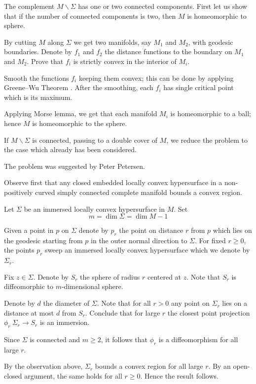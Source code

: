 The complement $M\backslash\Sigma$ has one or two connected components.
First let us show that if the number of connected components is two, 
then $M$ is homeomorphic to sphere.

By cutting $M$ along $\Sigma$ 
we get two manifolds, say $M_1$ and $M_2$,
with geodesic boundaries. 
Denote by $f_1$ and $f_2$ the distance functions to the boundary on $M_1$ and $M_2$.
Prove that  
$f_i$ is strictly convex in the interior of $M_i$.

Smooth the functions $f_i$ keeping them convex; 
this can be done by applying Greene--Wu Theorem \cite[see Theorem~2 in][]{greene-wu}.
After the smoothing, each $f_i$ has single critical point which is its maximum.

Applying Morse lemma, we get that each manifold $M_i$ is homeomorphic to a ball; 
hence $M$ 
is homeomorphic to the sphere.

If $M\backslash\Sigma$ is connected,
passing to a double cover of $M$,
we reduce the problem to the case which already has been considered.\qeds

The problem was suggested by Peter Petersen.



Observe first that any closed embedded locally convex hypersurface in a non-positively curved simply connected complete manifold bounds a convex region.


Let $\Sigma$ be an immersed locally convex hypersurface in $M$.
Set 
\[m=\dim \Sigma=\dim M-1\]

Given a point in $p$ on $\Sigma$ 
denote by $p_r$ the point on distance $r$ from $p$
which lies on the geodesic starting from $p$ in the outer normal direction to $\Sigma$.
For fixed $r\ge 0$,
the points $p_r$ sweep an immersed locally convex hypersurface which we denote by $\Sigma_r$.

Fix $z\in \Sigma$.
Denote by $S_r$ the sphere of radius $r$ centered at $z$.
Note that $S_r$ is diffeomorphic to $m$-dimensional sphere.

Denote by $d$ the diameter of $\Sigma$.
Note that for all $r>0$
any point on $\Sigma_r$
lies on a distance at most $d$ from $S_r$.
Conclude that for large $r$ the closest point projection $\phi_r\:\Sigma_r\to S_r$ is an immersion.


Since $\Sigma$ is connected
and $m\ge 2$, it follows that $\phi_r$ is a diffeomorphism for all large $r$.

By the observation above, $\Sigma_r$ bounds a convex region for all large $r$.
By an open-closed argument, the same holds for all $r\ge 0$.
Hence the result follows.\qeds

